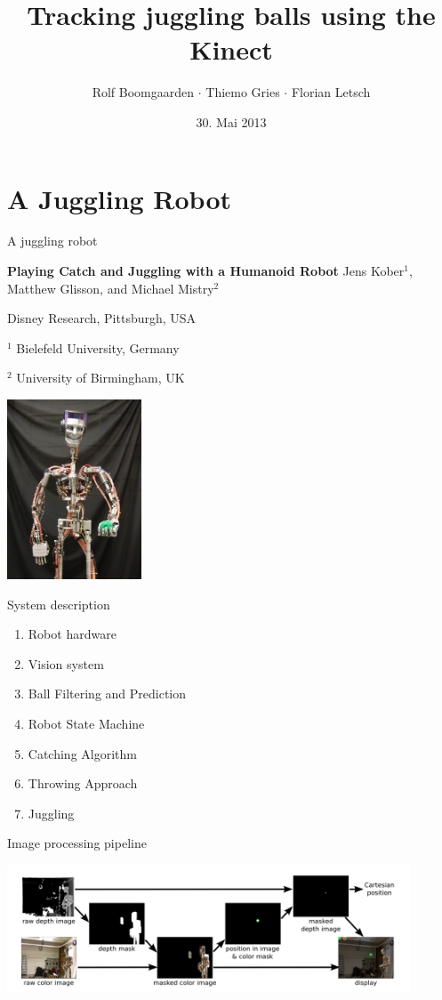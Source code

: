 \documentclass{beamer}
\title{Tracking juggling balls using the Kinect}
\author[Rolf $\cdot$ Thiemo $\cdot$ Flo]{Rolf Boomgaarden $\cdot$ Thiemo Gries $\cdot$ Florian Letsch}
\institute{Universität Hamburg}
\date{30. Mai 2013}
\begin{document}
\frame
{
\titlepage
}

\frame
{
\tableofcontents
}

\section{A Juggling Robot}

\begin{frame}{A juggling robot}

\textbf{Playing Catch and Juggling with a Humanoid Robot}
Jens Kober$^{1}$, Matthew Glisson, and Michael Mistry$^{2}$

Disney Research, Pittsburgh, USA

$^{1}$ Bielefeld University, Germany

$^{2}$ University of Birmingham, UK

\begin{center}\includegraphics[width=4cm]{img/robot.png}\end{center}
   
\end{frame}

\begin{frame}{System description}
\begin{enumerate}
\item Robot hardware
\item Vision system
\item Ball Filtering and Prediction
\item Robot State Machine
\item Catching Algorithm
\item Throwing Approach
\item Juggling
\end{enumerate}
\end{frame}

\begin{frame}{Image processing pipeline}
\begin{center}\includegraphics[width=12cm]{img/img-processing.png}\end{center}

\end{frame}
\end{document}
